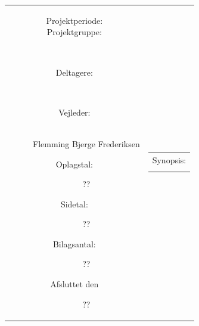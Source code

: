 \begin{titlingpage}
\begin{nopagebreak}
{\begin{tabular}{cc}
{\parbox{8cm}{
\begin{description}
\item[Projektperiode:] 
  \hspace{1cm}
\item[Projektgruppe:] \\
\hspace{1cm}
\item[Deltagere:] \mbox{} \\[3mm]
   \hspace{1cm}
\item[Vejleder:] \mbox{} \\[3mm]
Flemming Bjerge Frederiksen \\
\end{description}
}
\begin{description}
\item[Oplagstal:] ??
\item[Sidetal:] ??
\item[Bilagsantal:] ??
\item[Afsluttet den] ??
\end{description}
 \vfill } &
 \parbox{7cm}{
 \vspace{0.7cm}
 \hfill 
   \begin{tabular}{l}
  \textsf{Synopsis:}\bigskip \\
   \fbox{
     \parbox{6.5cm}{\bigskip {\vfill \small }}
\bigskip
}
    \end{tabular}
}
 \end{tabular}
 \\ \\ \\ \\ \\ \\
}
\end{nopagebreak}
\end{titlingpage}
